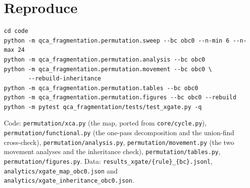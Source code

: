 \documentclass[11pt]{article}
\newcommand{\fn}[1]{\texttt{#1}}
\theoremstyle{plain}
\theoremstyle{definition}
\begin{document}
\section{Reproduce}

\begin{verbatim}
cd code
python -m qca_fragmentation.permutation.sweep --bc obc0 --n-min 6 --n-max 24
python -m qca_fragmentation.permutation.analysis --bc obc0
python -m qca_fragmentation.permutation.movement --bc obc0 \
       --rebuild-inheritance
python -m qca_fragmentation.permutation.tables --bc obc0
python -m qca_fragmentation.permutation.figures --bc obc0 --rebuild
python -m pytest qca_fragmentation/tests/test_xgate.py -q
\end{verbatim}

\begin{sloppypar}
Code: \fn{permutation/xca.py} (the map, ported from \fn{core/cycle.py}),
\fn{permutation/functional.py} (the one-pass decomposition and the union-find
cross-check), \fn{permutation/analysis.py}, \fn{permutation/movement.py} (the
two movement analyses and the inheritance check), \fn{permutation/tables.py},
\fn{permutation/figures.py}. Data:
\fn{results\_xgate/\{rule\}\_\{bc\}.jsonl},
\fn{analytics/xgate\_map\_obc0.json} and
\fn{analytics/xgate\_inheritance\_obc0.json}.
\end{sloppypar}
\end{document}
